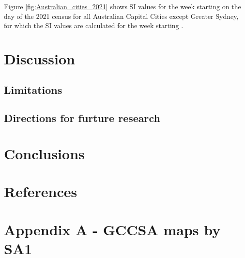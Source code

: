 \documentclass[preprint, 3p,
authoryear]{elsarticle} %
\begin{document}
Figure \ref{fig:Australian_cities_2021} shows SI values for the week
starting on the day of the 2021 census for all Australian Capital Cities
except Greater Sydney, for which the SI values are calculated for the
week starting .

\section{Discussion}\label{discussion}

\subsection{Limitations}\label{limitations}

\subsection{Directions for furture
research}\label{directions-for-furture-research}

\section{Conclusions}\label{conclusions}

\section*{References}\label{references}

\section{Appendix A - GCCSA maps by
SA1}\label{appendix-a---gccsa-maps-by-sa1}
\end{document}
